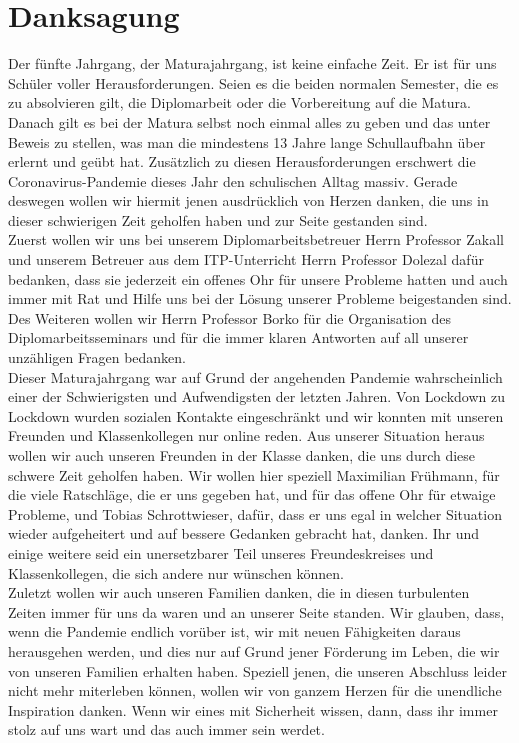\chapter{Danksagung} 
Der fünfte Jahrgang, der Maturajahrgang, ist keine einfache Zeit. Er ist für uns Schüler voller Herausforderungen. Seien es die beiden normalen Semester, die es zu absolvieren gilt, die Diplomarbeit oder die Vorbereitung auf die Matura. Danach gilt es bei der Matura selbst noch einmal alles zu geben und das unter Beweis zu stellen, was man die mindestens 13 Jahre lange Schullaufbahn über erlernt und geübt hat. Zusätzlich zu diesen Herausforderungen erschwert die Coronavirus-Pandemie dieses Jahr den schulischen Alltag massiv. Gerade deswegen wollen wir hiermit jenen ausdrücklich von Herzen danken, die uns in dieser schwierigen Zeit geholfen haben und zur Seite gestanden sind.\\

Zuerst wollen wir uns bei unserem Diplomarbeitsbetreuer Herrn Professor Zakall und unserem Betreuer aus dem ITP-Unterricht Herrn Professor Dolezal dafür bedanken, dass sie jederzeit ein offenes Ohr für unsere Probleme hatten und auch immer mit Rat und Hilfe uns bei der Lösung unserer Probleme beigestanden sind. Des Weiteren wollen wir Herrn Professor Borko für die Organisation des Diplomarbeitsseminars und für die immer klaren Antworten auf all unserer unzähligen Fragen bedanken.\\

Dieser Maturajahrgang war auf Grund der angehenden Pandemie wahrscheinlich einer der Schwierigsten und Aufwendigsten der letzten Jahren. Von Lockdown zu Lockdown wurden sozialen Kontakte eingeschränkt und wir konnten mit unseren Freunden und Klassenkollegen nur online reden. Aus unserer Situation heraus wollen wir auch unseren Freunden in der Klasse danken, die uns durch diese schwere Zeit geholfen haben. Wir wollen hier speziell Maximilian Frühmann, für die viele Ratschläge, die er uns gegeben hat, und für das offene Ohr für etwaige Probleme, und Tobias Schrottwieser, dafür, dass er uns egal in welcher Situation wieder aufgeheitert und auf bessere Gedanken gebracht hat, danken. Ihr und einige weitere seid ein unersetzbarer Teil unseres Freundeskreises und Klassenkollegen, die sich andere nur wünschen können.\\

Zuletzt wollen wir auch unseren Familien danken, die in diesen turbulenten Zeiten immer für uns da waren und an unserer Seite standen. Wir glauben, dass, wenn die Pandemie endlich vorüber ist, wir mit neuen Fähigkeiten daraus herausgehen werden, und dies nur auf Grund jener Förderung im Leben, die wir von unseren Familien erhalten haben. 
Speziell jenen, die unseren Abschluss leider nicht mehr miterleben können, wollen wir von ganzem Herzen für die unendliche Inspiration danken. Wenn wir eines mit Sicherheit wissen, dann, dass ihr immer stolz auf uns wart und das auch immer sein werdet.